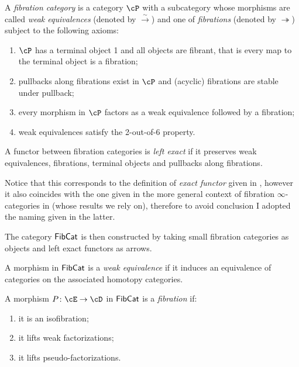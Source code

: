 \documentclass[a4paper,12pt]{scrartcl}
\begin{document}
\begin{defn}
  A \emph{fibration category} is a category $\cP$ with a subcategory whose
  morphisms are called \emph{weak equivalences} (denoted by
  $\xrightarrow{\sim}$) and one of \emph{fibrations} (denoted by
  $\twoheadrightarrow$) subject to the following axioms:
  \begin{enumerate}
    \item $\cP$ has a terminal object 1 and all objects are fibrant, that is
      every map to the terminal object is a fibration;
    \item pullbacks along fibrations exist in $\cP$ and (acyclic) fibrations are
      stable under pullback;
    \item every morphism in $\cP$ factors as a weak equivalence followed by a
      fibration;
    \item weak equivalences satisfy the 2-out-of-6 property.
  \end{enumerate}
\end{defn}

\begin{defn}
  A functor between fibration categories is \emph{left exact} if it preserves weak
  equivalences, fibrations, terminal objects and pullbacks along fibrations.
\end{defn}

Notice that this corresponds to the definition of \emph{exact functor} given
in \cite[Def.\ 2.7]{KS19}, however it also coincides with the one given in the
more general context of fibration $\infty$-categories in \cite[Def.\
7.5.2]{Cis19} (whose results we rely on), therefore to avoid conclusion I
adopted the naming given in the latter.

The category $\operatorname{\mathsf{FibCat}}$ is then constructed by taking small fibration categories
as objects and left exact functors as arrows.

\begin{defn}
  A morphism in $\operatorname{\mathsf{FibCat}}$ is a \emph{weak equivalence} if it induces an
  equivalence of categories on the associated homotopy categories.
\end{defn}

\begin{defn}
  A morphism $P\colon\cE\rightarrow\cD$ in $\operatorname{\mathsf{FibCat}}$ is a \emph{fibration} if:
  \begin{enumerate}
    \item it is an isofibration;
    \item it lifts weak factorizations;
    \item it lifts pseudo-factorizations.
  \end{enumerate}
\end{defn}
\end{document}
